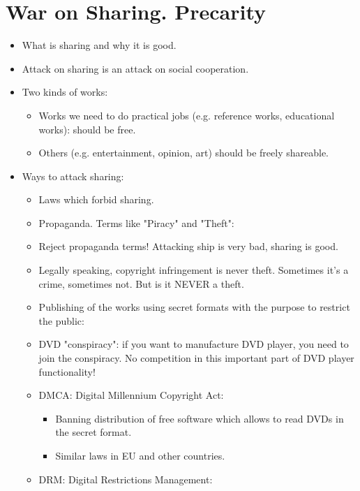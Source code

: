 \documentclass[twoside,openright]{report}
\begin{document}
\section{War on Sharing. Precarity}
\begin{itemize}
 \item    What is sharing and why it is good.
 \item    Attack on sharing is an attack on social cooperation.
 \item    Two kinds of works:
\begin{itemize}
 \item        Works we need to do practical jobs (e.g. reference works, educational works): should be free.
 \item        Others (e.g. entertainment, opinion, art) should be freely shareable.
\end{itemize}
 \item    Ways to attack sharing:
\begin{itemize}
 \item        Laws which forbid sharing.
 \item        Propaganda. Terms like "Piracy" and "Theft":
 \item            Reject propaganda terms! Attacking ship is very bad, sharing is good.
 \item            Legally speaking, copyright infringement is never theft. Sometimes it's a crime, sometimes not. But is it NEVER a theft.
 \item        Publishing of the works using secret formats with the purpose to restrict the public:
 \item            DVD "conspiracy": if you want to manufacture DVD player, you need to join the conspiracy. No competition in this important part of DVD player functionality!
 \item        DMCA: Digital Millennium Copyright Act: 
\begin{itemize}
 \item            Banning distribution of free software which allows to read DVDs in the secret format.
 \item            Similar laws in EU and other countries.
\end{itemize}
 \item        DRM: Digital Restrictions Management: 

\end{itemize}
\end{itemize}
\end{document}
